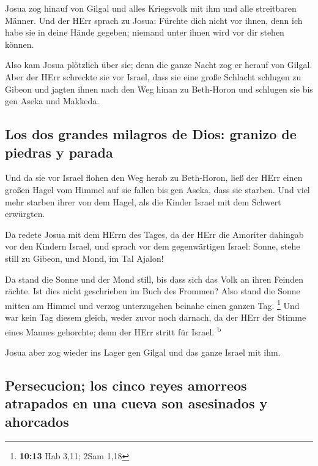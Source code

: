  Josua zog hinauf von Gilgal und alles Kriegsvolk mit ihm
und alle streitbaren Männer.  Und der HErr sprach zu
Josua: Fürchte dich nicht vor ihnen, denn ich habe sie in deine Hände
gegeben; niemand unter ihnen wird vor dir stehen können.

 Also kam Josua plötzlich über sie; denn die ganze Nacht
zog er herauf von Gilgal.  Aber der HErr schreckte sie
vor Israel, dass sie eine große Schlacht schlugen zu Gibeon und jagten
ihnen nach den Weg hinan zu Beth-Horon und schlugen sie bis gen Aseka
und Makkeda.

\hypertarget{los-dos-grandes-milagros-de-dios-granizo-de-piedras-y-parada}{%
\subsection{Los dos grandes milagros de Dios: granizo de piedras y
parada}\label{los-dos-grandes-milagros-de-dios-granizo-de-piedras-y-parada}}

 Und da sie vor Israel flohen den Weg herab zu
Beth-Horon, ließ der HErr einen großen Hagel vom Himmel auf sie fallen
bis gen Aseka, dass sie starben. Und viel mehr starben ihrer von dem
Hagel, als die Kinder Israel mit dem Schwert erwürgten.

 Da redete Josua mit dem HErrn des Tages, da der HErr die
Amoriter dahingab vor den Kindern Israel, und sprach vor dem
gegenwärtigen Israel: Sonne, stehe still zu Gibeon, und Mond, im Tal
Ajalon!

 Da stand die Sonne und der Mond still, bis dass sich das
Volk an ihren Feinden rächte. Ist dies nicht geschrieben im Buch des
Frommen? Also stand die Sonne mitten am Himmel und verzog unterzugehen
beinahe einen ganzen Tag. \footnote{\textbf{10:13} Hab 3,11; 2Sam 1,18}
 Und war kein Tag diesem gleich, weder zuvor noch
darnach, da der HErr der Stimme eines Mannes gehorchte; denn der HErr
stritt für Israel. \textsuperscript{b}

 Josua aber zog wieder ins Lager gen Gilgal und das ganze
Israel mit ihm.

\hypertarget{persecucion-los-cinco-reyes-amorreos-atrapados-en-una-cueva-son-asesinados-y-ahorcados}{%
\subsection{Persecucion; los cinco reyes amorreos atrapados en una cueva
son asesinados y
ahorcados}\label{persecucion-los-cinco-reyes-amorreos-atrapados-en-una-cueva-son-asesinados-y-ahorcados}}

